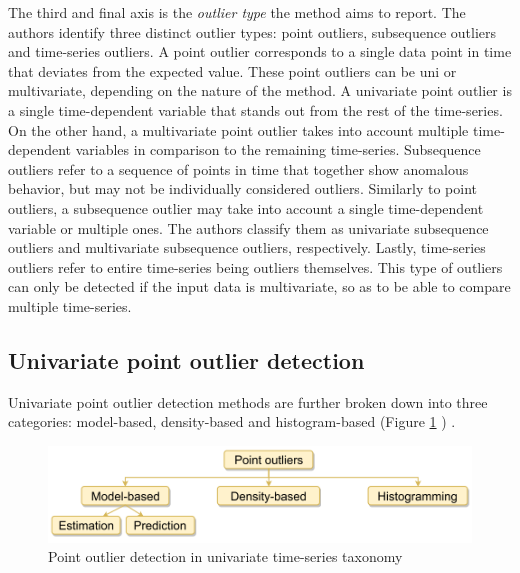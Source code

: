 The third and final axis is the \textit{outlier type} the method aims to report. The authors identify three distinct outlier types: point outliers, subsequence outliers and time-series outliers. A point outlier corresponds to a single data point in time that deviates from the expected value. These point outliers can be uni or multivariate, depending on the nature of the method. A univariate point outlier is a single time-dependent variable that stands out from the rest of the time-series. On the other hand, a multivariate point outlier takes into account multiple time-dependent variables in comparison to the remaining time-series. Subsequence outliers refer to a sequence of points in time that together show anomalous behavior, but may not be individually considered outliers. Similarly to point outliers, a subsequence outlier may take into account a single time-dependent variable or multiple ones. The authors classify them as univariate subsequence outliers and multivariate subsequence outliers, respectively. Lastly, time-series outliers refer to entire time-series being outliers themselves. This type of outliers can only be detected if the input data is multivariate, so as to be able to compare multiple time-series.

\subsection{Univariate point outlier detection}

Univariate point outlier detection methods are further broken down into three categories: model-based, density-based and histogram-based (Figure \ref{fig:point-outlier-taxonomy} \cite{Blazquez-Garcia-Review-Anomaly-Detection}) .
\begin{figure}[!htb]
  \begin{center}
    \includegraphics[scale=1]{figures/taxonomy-point-outlier-uni.png}
    \caption{Point outlier detection in univariate time-series taxonomy}
    \label{fig:point-outlier-taxonomy}
  \end{center}
\end{figure}

